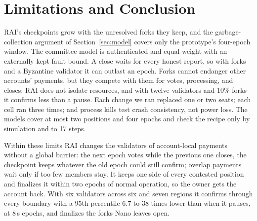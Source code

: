 \section{Limitations and Conclusion}
\label{sec:conclusion}
RAI's checkpoints grow with the unresolved forks they keep, and the garbage-collection argument of Section~\ref{sec:model} covers only the prototype's four-epoch window. The committee model is authenticated and equal-weight with an externally kept fault bound. A close waits for every honest report, so with forks and a Byzantine validator it can outlast an epoch. Forks cannot endanger other accounts' payments, but they compete with them for votes, processing, and closes; RAI does not isolate resources, and with twelve validators and 10\% forks it confirms less than a pause. Each change we ran replaced one or two seats; each cell ran three times; and process kills test crash consistency, not power loss. The models cover at most two positions and four epochs and check the recipe only by simulation and to 17 steps.

Within these limits RAI changes the validators of account-local payments without a global barrier: the next epoch votes while the previous one closes, the checkpoint keeps whatever the old epoch could still confirm; overlap payments wait only if too few members stay. It keeps one side of every contested position and finalizes it within two epochs of normal operation, so the owner gets the account back. With six validators across six and seven regions it confirms through every boundary with a 95th percentile 6.7 to 38 times lower than when it pauses, at 8\,s epochs, and finalizes the forks Nano leaves open.
